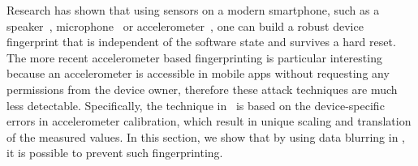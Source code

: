 Research has shown that using sensors on a modern smartphone, such as 
a speaker~\cite{das2014poster}, microphone~\cite{clarkson2012breaking} 
or accelerometer~\cite{bojinov2014mobile, dey2014accelprint}, one can 
build a robust device fingerprint that is independent of the software state
and survives a hard reset. The more recent accelerometer based fingerprinting
is particular interesting because an accelerometer is accessible in mobile apps
without requesting any permissions from the device owner, therefore these 
attack techniques are much less detectable. Specifically, the 
technique in~\cite{bojinov2014mobile} is based on the device-specific errors in 
accelerometer calibration, which result in unique scaling and translation of 
the measured values. In this section, we show that by using data blurring in 
\sysname, it is possible to prevent such fingerprinting. 


